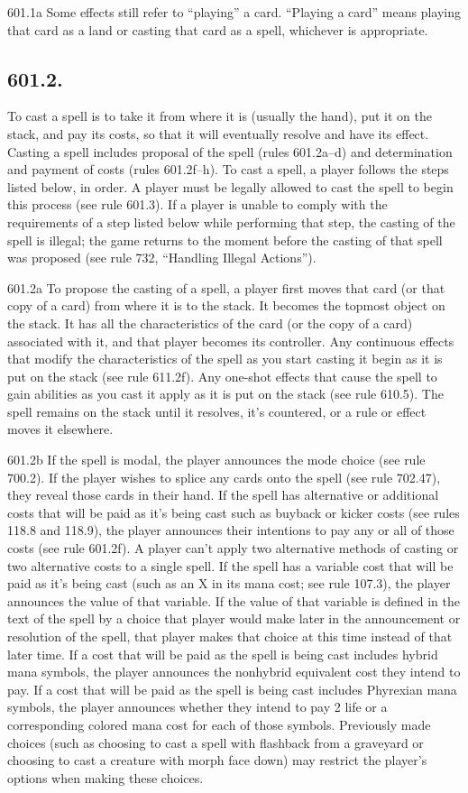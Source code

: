 601.1a Some effects still refer to “playing” a card. “Playing a card” means playing that card as a land or casting that card as a spell, whichever is appropriate.

\subsection*{601.2.}
To cast a spell is to take it from where it is (usually the hand), put it on the stack, and pay its costs, so that it will eventually resolve and have its effect. Casting a spell includes proposal of the spell (rules 601.2a–d) and determination and payment of costs (rules 601.2f–h). To cast a spell, a player follows the steps listed below, in order. A player must be legally allowed to cast the spell to begin this process (see rule 601.3). If a player is unable to comply with the requirements of a step listed below while performing that step, the casting of the spell is illegal; the game returns to the moment before the casting of that spell was proposed (see rule 732, “Handling Illegal Actions”).

601.2a To propose the casting of a spell, a player first moves that card (or that copy of a card) from where it is to the stack. It becomes the topmost object on the stack. It has all the characteristics of the card (or the copy of a card) associated with it, and that player becomes its controller. Any continuous effects that modify the characteristics of the spell as you start casting it begin as it is put on the stack (see rule 611.2f). Any one-shot effects that cause the spell to gain abilities as you cast it apply as it is put on the stack (see rule 610.5). The spell remains on the stack until it resolves, it’s countered, or a rule or effect moves it elsewhere.

601.2b If the spell is modal, the player announces the mode choice (see rule 700.2). If the player wishes to splice any cards onto the spell (see rule 702.47), they reveal those cards in their hand. If the spell has alternative or additional costs that will be paid as it’s being cast such as buyback or kicker costs (see rules 118.8 and 118.9), the player announces their intentions to pay any or all of those costs (see rule 601.2f). A player can’t apply two alternative methods of casting or two alternative costs to a single spell. If the spell has a variable cost that will be paid as it’s being cast (such as an {X} in its mana cost; see rule 107.3), the player announces the value of that variable. If the value of that variable is defined in the text of the spell by a choice that player would make later in the announcement or resolution of the spell, that player makes that choice at this time instead of that later time. If a cost that will be paid as the spell is being cast includes hybrid mana symbols, the player announces the nonhybrid equivalent cost they intend to pay. If a cost that will be paid as the spell is being cast includes Phyrexian mana symbols, the player announces whether they intend to pay 2 life or a corresponding colored mana cost for each of those symbols. Previously made choices (such as choosing to cast a spell with flashback from a graveyard or choosing to cast a creature with morph face down) may restrict the player’s options when making these choices.

